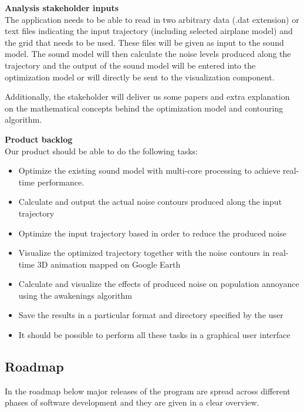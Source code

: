 ﻿\documentclass[a4paper,english,fleqn]{exam}
\begin{document}
\textbf{Analysis stakeholder inputs} \\
The application needs to be able to read in two arbitrary data (.dat extension) or text files indicating the input trajectory (including selected airplane model) and the grid that needs to be used. These files will be given as input to the sound model. The sound model will then calculate the noise levels produced along the trajectory and the output of the sound model will be entered into the optimization model or will directly be sent to the visualization component.

Additionally, the stakeholder will deliver us some papers and extra explanation on the mathematical concepts behind the optimization model and contouring algorithm.

\textbf{Product backlog} \\
Our product should be able to do the following tasks:

\begin{itemize}
\item Optimize the existing sound model with multi-core processing to achieve real-time performance.
\item Calculate and output the actual noise contours produced along the input trajectory
\item Optimize the input trajectory based in order to reduce the produced noise 
\item Visualize the optimized trajectory together with the noise contours in real-time 3D animation mapped on Google Earth
\item Calculate and visualize the effects of produced noise on population annoyance using the awakenings algorithm
\item Save the results in a particular format and directory specified by the user
\item It should be possible to perform all these tasks in a graphical user interface
\end{itemize}

\newpage 

\subsection{Roadmap}
In the roadmap below major releases of the program are spread across different phases of software development and they are given in a clear overview. \\
\end{document}
